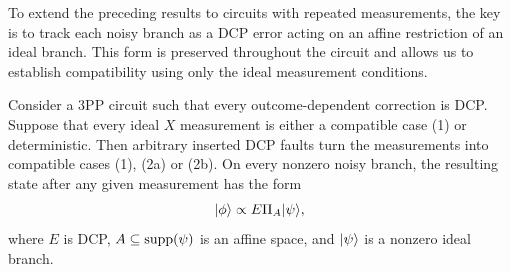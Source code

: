 To extend the preceding results to circuits with repeated measurements, the key is to track each noisy branch as a DCP error acting on an affine restriction of an ideal branch. This form is preserved throughout the circuit and allows us to establish compatibility using only the ideal measurement conditions.

\begin{theorem}
    \label{thm:iterative-measurements}
    Consider a 3PP circuit such that every outcome-dependent correction is DCP. Suppose that every ideal $X$ measurement is either a compatible case (1) or deterministic. Then arbitrary inserted DCP faults turn the measurements into compatible cases (1), (2a) or (2b). On every nonzero noisy branch, the resulting state after any given measurement has the form
    \begin{align} \label{eq:noisy-form-post-iterative-measurement}
        \ket{\phi} \propto E\Pi_{A}\ket{\psi},
    \end{align}
    where $E$ is DCP, $A \subseteq \supp(\psi)$ is an affine space, and $\ket{\psi}$ is a nonzero ideal branch.
\end{theorem}
